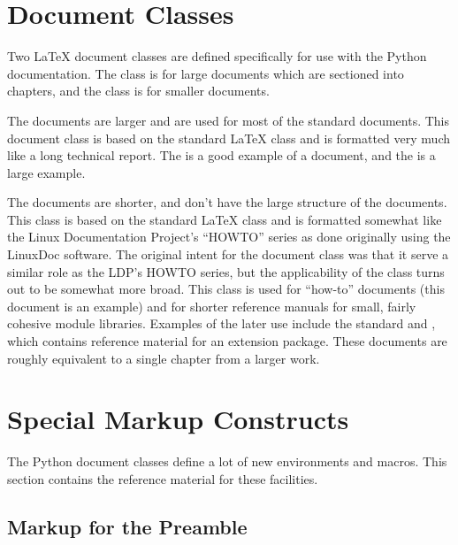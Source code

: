 \documentclass{howto}
\begin{document}
\section{Document Classes \label{classes}}

  Two \LaTeX{} document classes are defined specifically for use with
  the Python documentation.  The  class is for large
  documents which are sectioned into chapters, and the 
  class is for smaller documents.

  The  documents are larger and are used for most of the
  standard documents.  This document class is based on the standard
  \LaTeX{}  class and is formatted very much like a long
  technical report.  The  is a good example of a  document, and the
   is a large
  example.

  The  documents are shorter, and don't have the large
  structure of the  documents.  This class is based on
  the standard \LaTeX{}  class and is formatted somewhat
  like the Linux Documentation Project's ``HOWTO'' series as done
  originally using the LinuxDoc software.  The original intent for the
  document class was that it serve a similar role as the LDP's HOWTO
  series, but the applicability of the class turns out to be somewhat
  more broad.  This class is used for ``how-to'' documents (this
  document is an example) and for shorter reference manuals for small,
  fairly cohesive module libraries.  Examples of the later use include
  the standard 
  and
, which contains reference material for an
  extension package.  These documents are roughly equivalent to a
  single chapter from a larger work.


\section{Special Markup Constructs}

  The Python document classes define a lot of new environments and
  macros.  This section contains the reference material for these
  facilities.

  \subsection{Markup for the Preamble \label{preamble-info}}
\end{document}
